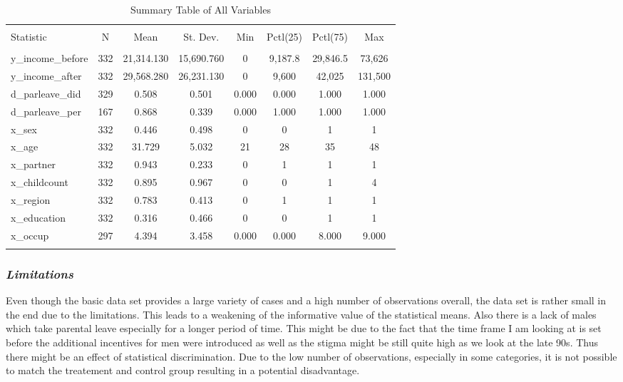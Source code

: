 \documentclass[
  12pt,
]{article}
\begin{document}
\begin{table}[!htbp] \centering 
  \caption{Summary Table of All Variables} 
  \label{tab1} 
\begin{tabular}{@{\extracolsep{5pt}}lccccccc} 
\\[-1.8ex]\hline 
\hline \\[-1.8ex] 
Statistic & \multicolumn{1}{c}{N} & \multicolumn{1}{c}{Mean} & \multicolumn{1}{c}{St. Dev.} & \multicolumn{1}{c}{Min} & \multicolumn{1}{c}{Pctl(25)} & \multicolumn{1}{c}{Pctl(75)} & \multicolumn{1}{c}{Max} \\ 
\hline \\[-1.8ex] 
y\_income\_before & 332 & 21,314.130 & 15,690.760 & 0 & 9,187.8 & 29,846.5 & 73,626 \\ 
y\_income\_after & 332 & 29,568.280 & 26,231.130 & 0 & 9,600 & 42,025 & 131,500 \\ 
d\_parleave\_did & 329 & 0.508 & 0.501 & 0.000 & 0.000 & 1.000 & 1.000 \\ 
d\_parleave\_per & 167 & 0.868 & 0.339 & 0.000 & 1.000 & 1.000 & 1.000 \\ 
x\_sex & 332 & 0.446 & 0.498 & 0 & 0 & 1 & 1 \\ 
x\_age & 332 & 31.729 & 5.032 & 21 & 28 & 35 & 48 \\ 
x\_partner & 332 & 0.943 & 0.233 & 0 & 1 & 1 & 1 \\ 
x\_childcount & 332 & 0.895 & 0.967 & 0 & 0 & 1 & 4 \\ 
x\_region & 332 & 0.783 & 0.413 & 0 & 1 & 1 & 1 \\ 
x\_education & 332 & 0.316 & 0.466 & 0 & 0 & 1 & 1 \\ 
x\_occup & 297 & 4.394 & 3.458 & 0.000 & 0.000 & 8.000 & 9.000 \\ 
\hline \\[-1.8ex] 
\end{tabular} 
\end{table}

\hypertarget{limitations}{%
\subsubsection*{\texorpdfstring{\emph{Limitations}}{Limitations}}\label{limitations}}

Even though the basic data set provides a large variety of cases and a high number of observations overall, the data set is rather small in the end due to the limitations. This leads to a weakening of the informative value of the statistical means. Also there is a lack of males which take parental leave especially for a longer period of time. This might be due to the fact that the time frame I am looking at is set before the additional incentives for men were introduced as well as the stigma might be still quite high as we look at the late 90s. Thus there might be an effect of statistical discrimination.
Due to the low number of observations, especially in some categories, it is not possible to match the treatement and control group resulting in a potential disadvantage.
\end{document}
